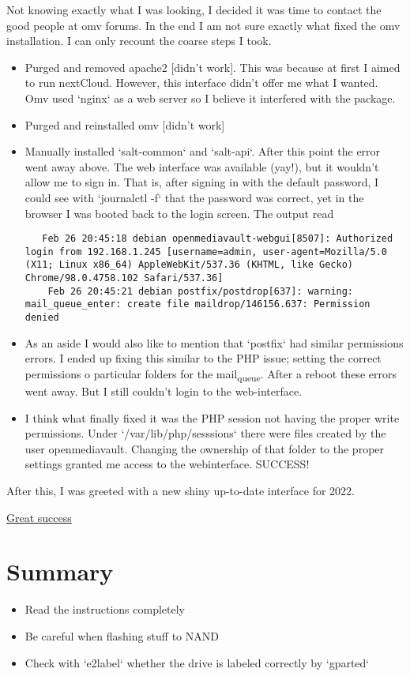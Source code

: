 \documentclass[11pt]{article}
\begin{document}
Not knowing  exactly what  I was looking,  I decided  it was
time to contact the good people  at omv forums. In the end I
am not sure  exactly what fixed the omv  installation. I can
only recount the coarse steps I took.

\begin{itemize}
\item Purged and removed apache2 [didn't work]. This was because
at first I aimed to run nextCloud. However, this interface
didn't offer me  what I wanted. Omv used `nginx`  as a web
server so I believe it interfered with the package.
\item Purged and reinstalled omv [didn't work]
\item Manually  installed  `salt-common` and  `salt-api`.  After
this point  the error went  away above. The  web interface
was available (yay!), but it wouldn't allow me to sign in.
That is,  after signing  in with  the default  password, I
could  see  with `journalctl  -f`  that  the password  was
correct, yet in the browser I was booted back to the login
screen. The output read
\begin{verbatim}
   Feb 26 20:45:18 debian openmediavault-webgui[8507]: Authorized login from 192.168.1.245 [username=admin, user-agent=Mozilla/5.0 (X11; Linux x86_64) AppleWebKit/537.36 (KHTML, like Gecko) Chrome/98.0.4758.102 Safari/537.36]
    Feb 26 20:45:21 debian postfix/postdrop[637]: warning: mail_queue_enter: create file maildrop/146156.637: Permission denied
\end{verbatim}
\item As an  aside I would  also like to mention  that `postfix`
had  similar permissions  errors. I  ended up  fixing this
similar to the PHP  issue; setting the correct permissions
o particular  folders for  the mail\textsubscript{queue}. After  a reboot
these errors went away. But  I still couldn't login to the
web-interface.
\item I  think what  finally fixed  it was  the PHP  session not
having    the    proper     write    permissions.    Under
`/var/lib/php/sesssions` there  were files created  by the
user openmediavault. Changing the ownership of that folder
to  the   proper  settings   granted  me  access   to  the
webinterface. SUCCESS!
\end{itemize}

After  this,  I was  greeted  with  a new  shiny  up-to-date
interface for 2022.

\href{./figures/omv-greeting.png}{Great success}





\section{Summary}
\label{sec:org13ad662}
\begin{itemize}
\item Read the instructions completely
\item Be careful when flashing stuff to NAND
\item Check  with  `e2label`  whether   the  drive  is  labeled
correctly by `gparted`
\end{itemize}
\end{document}

